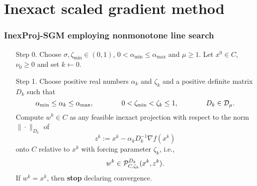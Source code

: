 \section{Inexact scaled gradient method}

\begingroup
\small
\begin{frame}[t]
  \frametitle{InexProj-SGM employing nonmonotone line search}

  \begin{enumerate}
    \item[Step 0.] Choose  $\sigma,{\zeta_{\min}}  \in (0, 1)$, $0 < \alpha_{\min} \leq \alpha_{\max}$ and $\mu \geq1$. Let $x^0\in C$, $\nu_0\geq 0$ and set $k\gets0$.

    \item[Step 1.] Choose positive real numbers $\alpha_k$ and $\zeta_k$ and a positive definite matrix $D_k$ such that
      \begin{equation*} 
        \alpha_{\min}\leq \alpha_k \leq \alpha_{\max}, \qquad \qquad 0 <{\zeta_{\min}}<\zeta_k \leq 1, \qquad \qquad D_k\in {\cal D}_{\mu}.
      \end{equation*}
      Compute  $w^{k}\in C$  as any feasible inexact projection  with respect to the norm $\| \cdot \| _{D_k}$ of 
      \[
        z^k := x^{k}-\alpha_k D_k^{-1}\nabla f(x^{k})
      \]
      onto $C$ relative to $x^{k}$  with forcing parameter $\zeta_k$, i.e.,
      \begin{equation*} 
        w^k \in   {\cal P}_{C, \zeta_k}^{D_k}(x^{k}, z^k).
      \end{equation*}
      If $w^k= x^k$, then {\bf stop} declaring convergence.
  \end{enumerate}
\end{frame}
\endgroup


